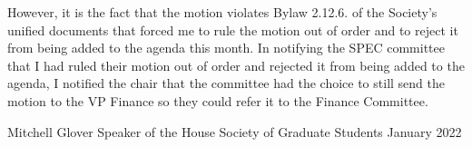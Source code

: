 \begin{multicols}{2}
However, it is the fact that the motion violates Bylaw 2.12.6. of the Society's unified documents that forced me to rule the motion out of order and to reject it from being added to the agenda this month. In notifying the SPEC committee that I had ruled their motion out of order and rejected it from being added to the agenda, I notified the chair that the committee had the choice to still send the motion to the VP Finance so they could refer it to the Finance Committee.
	
	
\end{multicols}


\vskip 2cm
\noindent
Mitchell Glover \newline
\indent
Speaker of the House \newline
\indent
Society of Graduate Students\newline 
{} January 2022
